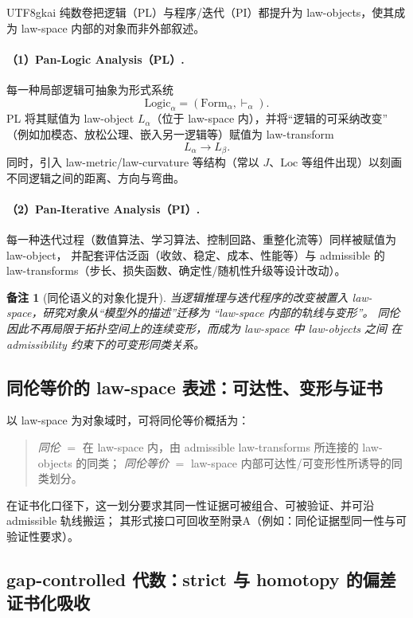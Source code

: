 \documentclass[12pt]{article}
\newtheorem{remark}{备注}[section]
\begin{document}
\begin{CJK*}{UTF8}{gkai}
纯数卷把逻辑（PL）与程序/迭代（PI）都提升为 law-objects，使其成为 law-space 内部的对象而非外部叙述。

\paragraph{（1）Pan-Logic Analysis（PL）.}
每一种局部逻辑可抽象为形式系统
\[
\mathrm{Logic}_\alpha=(\mathrm{Form}_\alpha,\vdash_\alpha).
\]
PL 将其赋值为 law-object $L_\alpha$（位于 law-space 内），并将“逻辑的可采纳改变”
（例如加模态、放松公理、嵌入另一逻辑等）赋值为 law-transform
\[
L_\alpha\longrightarrow L_\beta.
\]
同时，引入 law-metric/law-curvature 等结构（常以 $J$、$\mathrm{Loc}$ 等组件出现）以刻画不同逻辑之间的距离、方向与弯曲。

\paragraph{（2）Pan-Iterative Analysis（PI）.}
每一种迭代过程（数值算法、学习算法、控制回路、重整化流等）同样被赋值为 law-object，
并配套评估泛函（收敛、稳定、成本、性能等）与 admissible 的 law-transforms（步长、损失函数、确定性/随机性升级等设计改动）。

\begin{remark}[同伦语义的对象化提升]
当逻辑推理与迭代程序的改变被置入 law-space，研究对象从“模型外的描述”迁移为
“law-space 内部的轨线与变形”。
同伦因此不再局限于拓扑空间上的连续变形，而成为 law-space 中 law-objects 之间
在 admissibility 约束下的可变形同类关系。
\end{remark}

\subsection{同伦等价的 law-space 表述：可达性、变形与证书}
\label{subsec:tex19-ch2-lawspace-homotopy}

以 law-space 为对象域时，可将同伦等价概括为：
\begin{quote}
\emph{同伦} $=$ 在 law-space 内，由 admissible law-transforms 所连接的 law-objects 的同类；
\emph{同伦等价} $=$ law-space 内部可达性/可变形性所诱导的同类划分。
\end{quote}

在证书化口径下，这一划分要求其同一性证据可被组合、可被验证、并可沿 admissible 轨线搬运；
其形式接口可回收至附录A（例如：同伦证据型同一性与可验证性要求）。

\subsection{gap-controlled 代数：strict 与 homotopy 的偏差证书化吸收}
\label{subsec:tex19-ch2-gap-controlled-algebra}


\end{CJK*}
\end{document}
